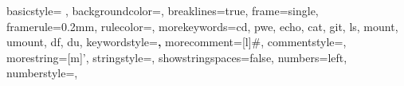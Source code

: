 {
    basicstyle= \ttfamily{}, %
    backgroundcolor=\color{background}, %
    breaklines=true, %
    frame=single,
    framerule=0.2mm, %
    rulecolor=\color{gray}, %
    morekeywords={cd, pwe, echo, cat, git, ls, mount, umount, df, du},
    keywordstyle=\color{blue}\textbf,
    morecomment=[l]{\#},
    commentstyle=\color{comment},
    morestring=[m]', %
    stringstyle=\color{string},
    showstringspaces=false,
    numbers=left,
    numberstyle={\ttfamily{}\color{gray}}, %
}

\makeatletter 
  \renewcommand\verbatim@font{\normalfont\ttfamily\color{comment}}
\makeatother

